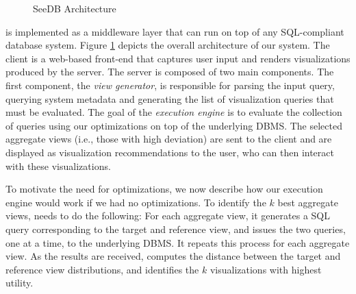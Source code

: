 \begin{figure}[htb]
\vspace{-10pt}
\centerline{
\hbox{}}
\vspace{-18pt}
\caption{SeeDB Architecture}
\label{fig:sys-arch}
\vspace{-12pt}
\end{figure} 


\SeeDB is implemented as a middleware layer that can run on
top of any SQL-compliant database system. 
Figure \ref{fig:sys-arch} depicts the overall architecture of our
system.  The \SeeDB client is a web-based front-end that captures user
input and renders visualizations produced by the \SeeDB server.  The
\SeeDB server is composed of two main components. The first
component, the {\it view generator}, is responsible for parsing the
input query, querying system metadata and generating the list of
visualization queries that must be evaluated.  
The goal of the {\em execution engine} is to evaluate the collection of queries
 using our optimizations on top of
the underlying DBMS.
The selected aggregate views (i.e., those with high deviation) 
are sent to the \SeeDB client 
and are displayed as visualization recommendations to the user, 
who can then interact with these
visualizations.

To motivate the need for optimizations, we now describe 
how our execution engine would work if we had no optimizations. 
To identify the $k$ best aggregate views,
\SeeDB needs to do the following:
For each aggregate view, it generates
a SQL query corresponding to the target
and reference view, and issues
the two queries, one at a time, to the underlying DBMS.
It repeats this process for each aggregate view.
As the results are received, \SeeDB computes the
distance between the target and reference view
distributions, and identifies the $k$ visualizations
with highest utility. 

